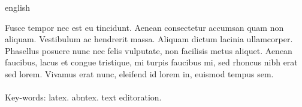 \begin{resumo}[Abstract]
\begin{otherlanguage*}{english}

Fusce tempor nec est eu tincidunt. Aenean consectetur accumsan quam non aliquam. Vestibulum ac hendrerit massa. Aliquam dictum lacinia ullamcorper. Phasellus posuere nunc nec felis vulputate, non facilisis metus aliquet. Aenean faucibus, lacus et congue tristique, mi turpis faucibus mi, sed rhoncus nibh erat sed lorem. Vivamus erat nunc, eleifend id lorem in, euismod tempus sem.
\\\\
\noindent
Key-words: latex. abntex. text editoration.

\end{otherlanguage*}
\end{resumo}